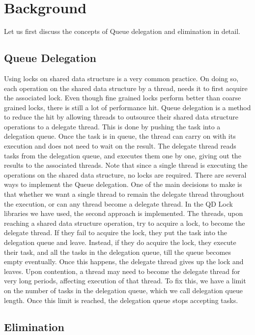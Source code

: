 \section{Background}
Let us first discuss the concepts of Queue delegation and elimination in detail.
\subsection{Queue Delegation}
Using locks on shared data structure is a very common practice. On doing so, each operation on the shared data structure by a thread, needs it to first acquire the associated lock. Even though fine grained locks perform better than coarse grained locks, there is still a lot of performance hit. Queue delegation is a method to reduce the hit by allowing threads to outsource their shared data structure operations to a delegate thread. This is done by pushing the task into a delegation queue. Once the task is in queue, the thread can carry on with its execution and does not need to wait on the result.
The delegate thread reads tasks from the delegation queue, and executes them one by one, giving out the results to the associated threads. Note that since a single thread is executing the operations on the shared data structure, no locks are required.
There are several ways to implement the Queue delegation. One of the main decisions to make is that whether we want a single thread to remain the delegate thread throughout the execution, or can any thread become a delegate thread. In the QD Lock libraries we have used, the second approach is implemented. The threads, upon reaching a shared data structure operation, try to acquire a lock, to become the delegate thread. If they fail to acquire the lock, they put the task into the delegation queue and leave. Instead, if they do acquire the lock, they execute their task, and all the tasks in the delegation queue, till the queue becomes empty eventually. Once this happens, the delegate thread gives up the lock and leaves. Upon contention, a thread may need to become the delegate thread for very long periods, affecting execution of that thread. To fix this, we have a limit on the number of tasks in the delegation queue, which we call delegation queue length. Once this limit is reached, the delegation queue stops accepting tasks.

\subsection{Elimination}


